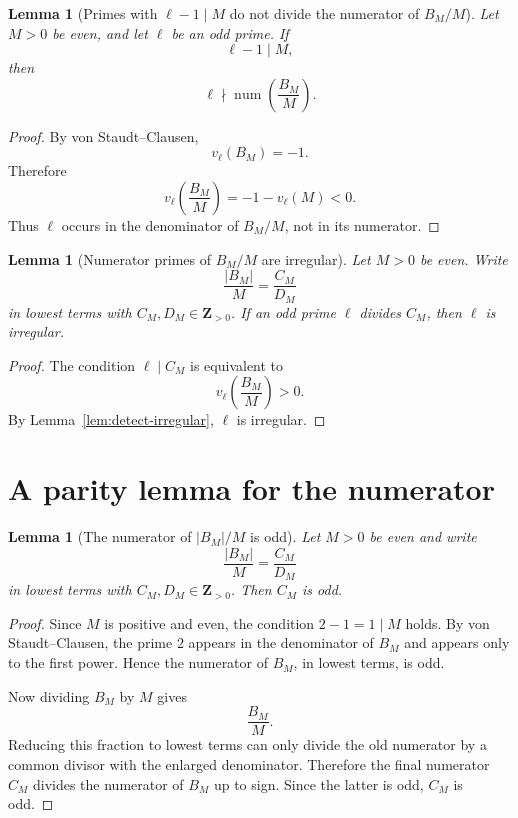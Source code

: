 \documentclass[11pt]{article}
\newtheorem{lemma}[theorem]{Lemma}
\newcommand{\Z}{\mathbf Z}
\newcommand{\num}{\operatorname{num}}
\begin{document}
\begin{lemma}[Primes with $\ell-1\mid M$ do not divide the numerator of $B_M/M$]\label{lem:exclude-old}
Let $M>0$ be even, and let $\ell$ be an odd prime.  If
\[
  \ell-1\mid M,
\]
then
\[
  \ell\nmid \num\left(\frac{B_M}{M}\right).
\]
\end{lemma}

\begin{proof}
By von Staudt--Clausen,
\[
  v_\ell(B_M)=-1.
\]
Therefore
\[
  v_\ell\left(\frac{B_M}{M}\right)
  =-1-v_\ell(M)<0.
\]
Thus $\ell$ occurs in the denominator of $B_M/M$, not in its numerator.
\end{proof}

\begin{lemma}[Numerator primes of $B_M/M$ are irregular]\label{lem:numer-primes-irreg}
Let $M>0$ be even.  Write
\[
  \frac{|B_M|}{M}=\frac{C_M}{D_M}
\]
in lowest terms with $C_M,D_M\in\Z_{>0}$.  If an odd prime $\ell$ divides $C_M$, then $\ell$ is irregular.
\end{lemma}

\begin{proof}
The condition $\ell\mid C_M$ is equivalent to
\[
  v_\ell\left(\frac{B_M}{M}\right)>0.
\]
By Lemma~\ref{lem:detect-irregular}, $\ell$ is irregular.
\end{proof}

\section{A parity lemma for the numerator}

\begin{lemma}[The numerator of $|B_M|/M$ is odd]\label{lem:odd-num}
Let $M>0$ be even and write
\[
  \frac{|B_M|}{M}=\frac{C_M}{D_M}
\]
in lowest terms with $C_M,D_M\in\Z_{>0}$.  Then $C_M$ is odd.
\end{lemma}

\begin{proof}
Since $M$ is positive and even, the condition $2-1=1\mid M$ holds.  By von Staudt--Clausen, the prime $2$ appears in the denominator of $B_M$ and appears only to the first power.  Hence the numerator of $B_M$, in lowest terms, is odd.

Now dividing $B_M$ by $M$ gives
\[
  \frac{B_M}{M}.
\]
Reducing this fraction to lowest terms can only divide the old numerator by a common divisor with the enlarged denominator.  Therefore the final numerator $C_M$ divides the numerator of $B_M$ up to sign.  Since the latter is odd, $C_M$ is odd.
\end{proof}
\end{document}
